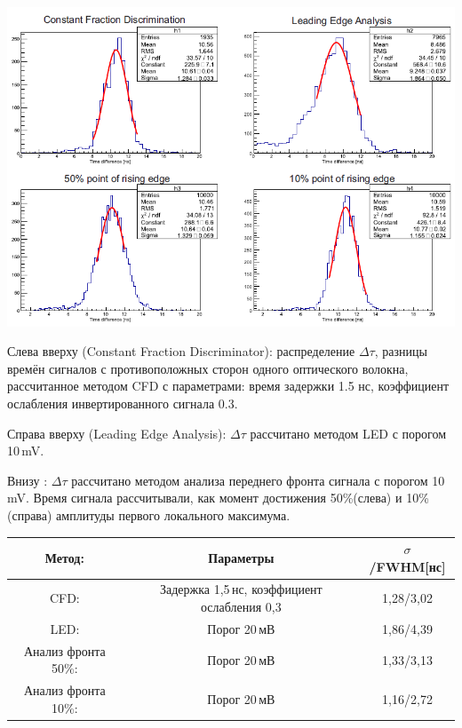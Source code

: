

{
	\centering
	\includegraphics[width=0.8\linewidth]{tau.png}
	\label{ris:Tau}
}


Слева вверху (Constant Fraction Discriminator): распределение $\Delta\tau$, разницы времён сигналов с противоположных сторон одного оптического волокна, рассчитанное методом CFD с параметрами: время задержки 1.5 нс, коэффициент ослабления инвертированного сигнала  0.3.

Справа вверху (Leading Edge Analysis): $\Delta\tau$ рассчитано методом LED с порогом 10\,mV. 

Внизу : $\Delta\tau$ рассчитано методом анализа переднего фронта сигнала с порогом 10 mV. Время сигнала рассчитывали, как момент достижения 50\%(слева) и 10\%(справа) амплитуды первого локального максимума.
 
{
	\centering
	\begin{tabular}{|c|c|c|}
		\hline
		\textbf{Метод}: & Параметры & $\sigma$/FWHM[нс]\\
		\hline
		CFD: & Задержка  1,5\,нс, коэффициент ослабления 0,3 & 1,28/3,02\\
		\hline
		LED: & Порог 20\,мВ &  1,86/4,39\\
		\hline
		Анализ фронта 50\%: & Порог 20\,мВ &  1,33/3,13\\
		\hline
		Анализ фронта 10\%: & Порог 20\,мВ &  1,16/2,72\\
		\hline
	\end{tabular}
	\label{tab:results}
}
 
